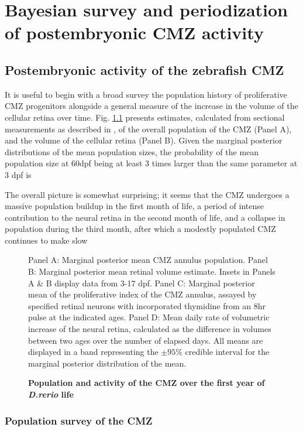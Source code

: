 \chapter{Bayesian survey and periodization of postembryonic CMZ activity}
\label{chap:CMZ}


\section{Postembryonic activity of the zebrafish CMZ}
It is useful to begin with a broad survey the population history of proliferative CMZ progenitors alongside a general measure of the increase in the volume of the cellular retina over time.  Fig. \ref{CMZoverall} presents estimates, calculated from sectional measurements as described in , of the overall population of the CMZ (Panel A), and the volume of the cellular retina (Panel B). Given the marginal posterior distributions of the mean population sizes, the probability of the mean population size at 60dpf being at least 3 times larger than the same parameter at 3 dpf is 

The overall picture is somewhat surprising; it seems that the CMZ undergoes a massive population buildup in the first month of life, a period of intense contribution to the neural retina in the second month of life, and a collapse in population during the third month, after which a modestly populated CMZ continues to make slow 

\begin{figure}[!h]
    \caption{{\bf Population and activity of the CMZ over the first year of \textit{D.rerio} life}}
    Panel A: Marginal posterior mean CMZ annulus population. Panel B: Marginal posterior mean retinal volume estimate. Insets in Panels A \& B display data from 3-17 dpf. Panel C: Marginal posterior mean of the proliferative index of the CMZ annulus, assayed by specified retinal neurons with incorporated thymidine from an 8hr pulse at the indicated ages. Panel D: Mean daily rate of volumetric increase of the neural retina, calculated as the difference in volumes between two ages over the number of elapsed days. All means are displayed in a band representing the $\pm 95 \%$ credible interval for the marginal posterior distribution of the mean.
    \label{CMZoverall}
\end{figure}

\subsection{Population survey of the CMZ}

